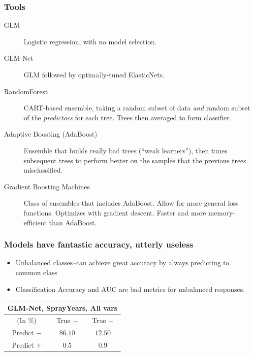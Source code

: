 \documentclass[handout]{beamer}
\begin{document}
\begin{frame}
\frametitle{Tools}
\begin{description}
\item[GLM] Logistic regression, with no model selection.
\item[GLM-Net] GLM followed by optimally-tuned ElasticNets.
\item[RandomForest] CART-based ensemble, taking a random subset of data \emph{and} random subset of the \emph{predictors} for each tree. Trees then averaged to form classifier.
\item[Adaptive Boosting (AdaBoost)] Ensemble that builds really bad trees (``weak learners''), then tunes subsequent trees to perform better on the samples that the previous trees misclassified.
\item[Gradient Boosting Machines] Class of ensembles that includes AdaBoost. Allow for more general loss functions. Optimizes with gradient descent. Faster and more memory-efficient than AdaBoost.
\end{description}
\end{frame}

\begin{frame}
\frametitle{Models have fantastic accuracy, utterly useless}
\begin{itemize}
\item Unbalanced classes--can achieve great accuracy by always predicting to common class
\item Classification Accuracy and AUC are bad metrics for unbalanced responses.
\end{itemize}

\begin{center}
\begin{tabular}{|c|c|c|} \hline
\multicolumn{3}{|c|}{GLM-Net, SprayYears, All vars} \\ \hline
(In $\%$) & True $-$ & True $+$ \\ \hline 
Predict $-$ & $86.10$ & $12.50$ \\ \hline 
Predict $+$ & $0.5$ & $0.9$ \\ \hline 
\end{tabular} 
\end{center}
\end{frame}
\end{document}

